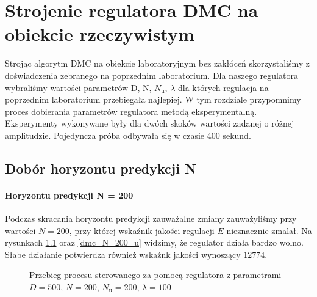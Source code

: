 \chapter{Strojenie regulatora DMC na obiekcie rzeczywistym}
\label{lab5_dmc}
Strojąc algorytm DMC na obiekcie laboratoryjnym bez zakłóceń skorzystaliśmy z doświadczenia 
zebranego na poprzednim laboratorium. Dla naszego regulatora wybraliśmy wartości parametrów
 D, N, $N_\mathrm{u}$, $\lambda$ dla których regulacja na poprzednim laboratorium przebiegała 
 najlepiej. W tym rozdziale przypomnimy proces dobierania parametrów regulatora metodą eksperymentalną.
\indent{} Eksperymenty wykonywane były dla dwóch skoków wartości zadanej o różnej amplitudzie. 
Pojedyncza próba odbywała się w czasie 400 sekund.

\section{Dobór horyzontu predykcji N}
\subsubsection{Horyzontu predykcji N = 200}
Podczas skracania horyzontu predykcji zauważalne zmiany zauważyliśmy przy wartości $N = 200$, przy której wskaźnik jakości regulacji $E$ nieznacznie zmalał. Na rysunkach \ref{dmc_N_200_y} oraz \ref{dmc_N_200_u} widzimy, że regulator działa bardzo wolno. Słabe działanie potwierdza również wskaźnk jakości wynoszący $\num{12774}$.

\begin{figure}[t]
    \centering
    \caption{Przebieg procesu sterowanego za pomocą regulatora z parametrami $D = 500$, $N = 200$, $N_{\mathrm{u}} = 200$, $\lambda = 100$}
    \label{dmc_N_200_y}
\end{figure}

